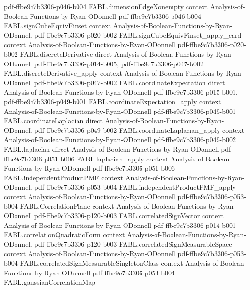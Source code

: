 \begin{theorem}
  {pdf-ffbe9c7b3306-p046-b004}
\proofstep
  {FABL.dimensionEdgeNonempty}
  {context}
  {Analysis-of-Boolean-Functions-by-Ryan-ODonnell}
  {pdf-ffbe9c7b3306-p046-b004}
\proofstep
  {FABL.signCubeEquivFinset}
  {context}
  {Analysis-of-Boolean-Functions-by-Ryan-ODonnell}
  {pdf-ffbe9c7b3306-p020-b002}
\proofstep
  {FABL.signCubeEquivFinset_apply_card}
  {context}
  {Analysis-of-Boolean-Functions-by-Ryan-ODonnell}
  {pdf-ffbe9c7b3306-p020-b002}
\proofstep
  {FABL.discreteDerivative}
  {direct}
  {Analysis-of-Boolean-Functions-by-Ryan-ODonnell}
  {pdf-ffbe9c7b3306-p014-b005,
    pdf-ffbe9c7b3306-p047-b002}
\proofstep
  {FABL.discreteDerivative_apply}
  {context}
  {Analysis-of-Boolean-Functions-by-Ryan-ODonnell}
  {pdf-ffbe9c7b3306-p047-b002}
\proofstep
  {FABL.coordinateExpectation}
  {direct}
  {Analysis-of-Boolean-Functions-by-Ryan-ODonnell}
  {pdf-ffbe9c7b3306-p015-b001,
    pdf-ffbe9c7b3306-p049-b001}
\proofstep
  {FABL.coordinateExpectation_apply}
  {context}
  {Analysis-of-Boolean-Functions-by-Ryan-ODonnell}
  {pdf-ffbe9c7b3306-p049-b001}
\proofstep
  {FABL.coordinateLaplacian}
  {direct}
  {Analysis-of-Boolean-Functions-by-Ryan-ODonnell}
  {pdf-ffbe9c7b3306-p049-b002}
\proofstep
  {FABL.coordinateLaplacian_apply}
  {context}
  {Analysis-of-Boolean-Functions-by-Ryan-ODonnell}
  {pdf-ffbe9c7b3306-p049-b002}
\proofstep
  {FABL.laplacian}
  {direct}
  {Analysis-of-Boolean-Functions-by-Ryan-ODonnell}
  {pdf-ffbe9c7b3306-p051-b006}
\proofstep
  {FABL.laplacian_apply}
  {context}
  {Analysis-of-Boolean-Functions-by-Ryan-ODonnell}
  {pdf-ffbe9c7b3306-p051-b006}
\proofstep
  {FABL.independentProductPMF}
  {context}
  {Analysis-of-Boolean-Functions-by-Ryan-ODonnell}
  {pdf-ffbe9c7b3306-p053-b004}
\proofstep
  {FABL.independentProductPMF_apply}
  {context}
  {Analysis-of-Boolean-Functions-by-Ryan-ODonnell}
  {pdf-ffbe9c7b3306-p053-b004}
\proofstep
  {FABL.CorrelationPlane}
  {context}
  {Analysis-of-Boolean-Functions-by-Ryan-ODonnell}
  {pdf-ffbe9c7b3306-p120-b003}
\proofstep
  {FABL.correlatedSignVector}
  {context}
  {Analysis-of-Boolean-Functions-by-Ryan-ODonnell}
  {pdf-ffbe9c7b3306-p014-b001}
\proofstep
  {FABL.correlationQuadraticForm}
  {context}
  {Analysis-of-Boolean-Functions-by-Ryan-ODonnell}
  {pdf-ffbe9c7b3306-p120-b003}
\proofstep
  {FABL.correlatedSignMeasurableSpace}
  {context}
  {Analysis-of-Boolean-Functions-by-Ryan-ODonnell}
  {pdf-ffbe9c7b3306-p053-b004}
\proofstep
  {FABL.correlatedSignMeasurableSingletonClass}
  {context}
  {Analysis-of-Boolean-Functions-by-Ryan-ODonnell}
  {pdf-ffbe9c7b3306-p053-b004}
\proofstep
  {FABL.gaussianCorrelationMap}

\end{theorem}
